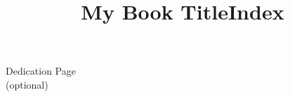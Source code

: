 \documentclass{ws-book975x65}
\title{My Book Title}              %
\begin{document}
\titlepages                        %

\begin{dedication}
\large Dedication Page \\[13pt]    %
\large (optional)
\end{dedication}

\blankpage                         %




\tableofcontents



\setcounter{page}{1}














% 

\blankpage                         %
\title{Index}                      %
\printindex
\end{document}
